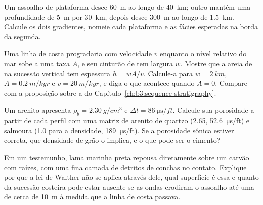 \begin{exercise}[$\star\star$]\label{exo:b3:facies-models:9}
Um assoalho de plataforma desce \qty{60}{m} ao longo de \qty{40}{km}; outro mantém uma
profundidade de \qty{5}{m} por \qty{30}{km}, depois desce \qty{300}{m} ao longo de
\qty{1.5}{km}. Calcule os dois gradientes, nomeie cada plataforma e as fácies
esperadas na borda da segunda.
\end{exercise}

\begin{exercise}[$\star\star\star$]\label{exo:b3:facies-models:10}
Uma linha de costa progradaria com velocidade $v$ enquanto o nível relativo do mar sobe a uma taxa
$A$, e seu cinturão de  tem largura $w$. Mostre que a areia de  na
sucessão vertical tem espessura $h = wA/v$. Calcule-a para $w = \qty{2}{km}$,
$A = \qty{0.2}{m/kyr}$ e $v = \qty{20}{m/kyr}$, e diga o que acontece quando
$A = 0$. Compare com a proposição sobre a  do
Capítulo~\ref{ch:b3:sequence-stratigraphy}.
\end{exercise}

\begin{exercise}[$\star\star\star$]\label{exo:b3:facies-models:11}
Um arenito apresenta $\rho_b = \qty{2.30}{g/cm^3}$ e $\Delta t =
\qty{86}{\micro\second/ft}$. Calcule sua porosidade a partir de cada perfil com uma matriz
de arenito de quartzo (2.65, \qty{52.6}{\micro\second/ft}) e salmoura (1.0 para a
densidade, \qty{189}{\micro\second/ft}). Se a porosidade sônica estiver correta, que
densidade de grão o  implica, e o que pode ser o cimento?
\end{exercise}

\begin{exercise}[$\star\star\star$]\label{exo:b3:facies-models:12}
Em um testemunho, lama marinha preta repousa diretamente sobre um carvão com raízes, com uma
fina camada de detritos de conchas no contato. Explique por que a lei de Walther não se
aplica através dele, qual superfície é essa e quanto da sucessão costeira
pode estar ausente se as ondas erodiram o assoalho até uma 
de cerca de \qty{10}{m} à medida que a linha de costa passava.
\end{exercise}

